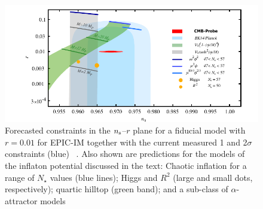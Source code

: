 \begin{figure}[ht!]
\hspace{-0.2in}
\parbox{4.in}{\centerline {
\includegraphics[width=4.5in]{figs/nsrlabeledrp01v1} } }
\hspace{-0.05in}
\parbox{2.5in}{
\caption{ \small \setlength{\baselineskip}{0.95\baselineskip}
Forecasted constraints in the $n_{\rm s}$--$r$ plane for a fiducial model with $r=0.01$ for EPIC-IM together 
with the current measured 1 and 2$\sigma$ constraints (blue) ~\cite{Array:2015xqh}. Also shown are predictions 
for the models of the inflaton potential discussed in the text: Chaotic inflation for a range of $N_\star$ values (blue lines); 
Higgs and $R^2$ (large and small dots, respectively);  quartic hilltop (green band); and a sub-class of $\alpha$-attractor
models~\cite{Kallosh:2013hoa}
\label{fig:nsrp01} } }
\vspace{-0.1in}
\end{figure}

